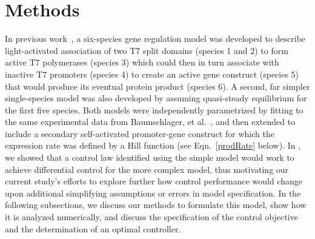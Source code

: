 \documentclass[12pt]{article}
\begin{document}
\section{Methods}
In previous work~\cite{May2021}, a six-species gene regulation model was developed to describe light-activated association of two T7 split domains (species 1 and 2) to form active T7 polymerases (species 3) which could then in turn associate with inactive T7 promoters (species 4) to create an active gene construct (species 5) that would produce its eventual protein product (species 6). A second, far simpler single-species model was also developed by assuming quasi-steady equilibrium for the first five species. Both models were independently parametrized by fitting to the same experimental data from Baumschlager, et al.~\cite{XXX}, and then extended to include a secondary self-activated promoter-gene construct for which the expression rate was defined by a Hill function (see Eqn.\ \ref{prodRate} below). In \cite{May2021}, we showed that a control law identified using the simple model would work to achieve differential control for the more complex model, thus motivating our current study's efforts to explore further how control performance would change upon additional simplifying assumptions or errors in model specification.  In the following subsections, we discuss our methods to formulate this model, show how it is analyzed numerically, and discuss the specification of the control objective and the determination of an optimal controller.
\end{document}
